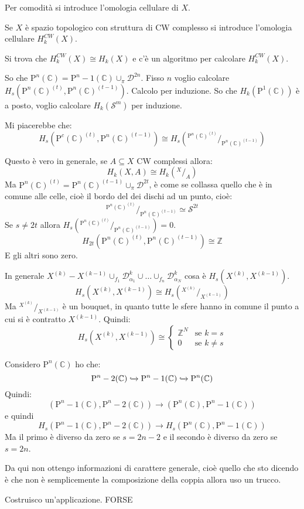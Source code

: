 \documentclass[10pt, twoside=false, x11names]{scrbook}
\newcommand{\Z}{\mathbb{Z}}
\newcommand{\Pjc}[1]{\mathrm{P}^#1 (\mathbb{C})}
\newcommand{\Sph}[1][]{\mathcal{S}^#1}
\newcommand{\Disk}[1][]{\mathcal{D}^#1}
\newcommand{\incl}{\xhookrightarrow{}}
\newcommand*\quot[2]{{^{\textstyle #1}\big/_{\textstyle #2}}}
\begin{document}
Per comodità si introduce l'omologia cellulare di $ X $.

Se $ X $ è spazio topologico con struttura di CW complesso si introduce
l'omologia cellulare $ H_k^{CW}(X) $.

Si trova che $ H_k^{CW}(X) \cong H_k(X) $ e c'è un algoritmo per calcolare $ H_k^{CW}(X) $.

So che $ \Pjc{n} = \Pjc{n-1} \cup_\pi \Disk{2n} $. Fisso $ n $ voglio calcolare
$ H_s(\Pjc{n}^{(t)}, \Pjc{n}^{(t-1)}) $.
Calcolo per induzione.
So che $ H_k(\Pjc{1}) $ è a posto, voglio calcolare $ H_k(\Sph{m}) $ per induzione.

Mi piacerebbe che:
\[
  H_s(\Pjc{c}^{(t)}, \Pjc{n}^{(t-1)}) \cong H_s(\quot{\Pjc{n}^{(t)}}{\Pjc{n}^{(t-1)}})
\]

Questo è vero in generale, se $ A \subseteq X $ CW complessi allora:
\[
  H_k(X,A) \cong H_k(\quot{X}{A})
\]
Ma $ \Pjc{n}^{(t)} = \Pjc{n}^{(t-1)} \cup_\pi \Disk{2t} $, è come se collassa
quello che è in comune alle celle, cioè il bordo del dei dischi ad un punto,
cioè:
\[
  \quot{\Pjc{n}^{(t)}}{\Pjc{n}^{(t-1)}} \simeq \Sph{2t}
\]
Se $ s \not = 2 t $ allora $ H_s(\quot{\Pjc{n}^{(t)}}{\Pjc{n}^{(t-1)}}) = 0 $.
\[
  H_{2t}(\Pjc{n}^{(t)}, \Pjc{n}^{(t-1)}) \cong \Z
\]
E gli altri sono zero.

In generale $ X^{(k)}- X^{(k-1)} \cup_{f_1} \Disk{k}_{\alpha_1} \cup \dots \cup_{f_n} \Disk{k}_{\alpha_N} $
cosa è $ H_s(X^{(k)}, X^{(k-1)}) $.
\[
  H_s(X^{(k)}, X^{(k-1)}) \cong H_s(\quot{X^{(k)}}{X^{(k-1)}})
\]
Ma $ \quot{X^{(k)}}{X^{(k-1)}} $ è un bouquet, in quanto tutte le sfere hanno in comune
il punto a cui si è contratto $ X^{(k-1)} $.
Quindi:
\[
  H_s(X^{(k)}, X^{(k-1)}) \cong
  \begin{cases}
    \Z^N & \text{se } k = s \\
    0 & \text{se } k \not = s
  \end{cases}
\]

Considero $ \Pjc{n} $ ho che:
\[
  \Pjc{n-2} \incl \Pjc{n-1} \incl \Pjc{n}
\]
Quindi:
\[
  (\Pjc{n-1}, \Pjc{n-2}) \to (\Pjc{n}, \Pjc{n-1})
\]
e quindi
\[
  H_s(\Pjc{n-1}, \Pjc{n-2}) \to H_s(\Pjc{n}, \Pjc{n-1})
\]
Ma il primo è diverso da zero se $ s = 2n - 2 $ e
il secondo è diverso da zero se $ s = 2n $.

Da qui non ottengo informazioni di carattere generale,
cioè quello che sto dicendo è che non è semplicemente
la composizione della coppia allora uso un trucco.

Costruisco un'applicazione. FORSE
\end{document}
